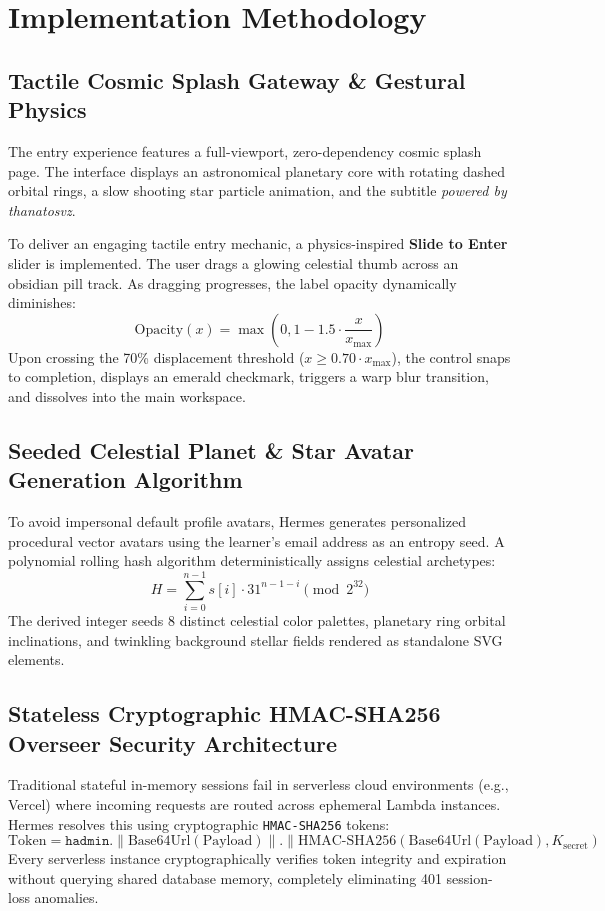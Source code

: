 \documentclass[12pt,a4paper]{article}
\begin{document}
\section{Implementation Methodology}

\subsection{Tactile Cosmic Splash Gateway \& Gestural Physics}
The entry experience features a full-viewport, zero-dependency cosmic splash page. The interface displays an astronomical planetary core with rotating dashed orbital rings, a slow shooting star particle animation, and the subtitle \textit{powered by thanatosvz}. 

To deliver an engaging tactile entry mechanic, a physics-inspired \textbf{Slide to Enter} slider is implemented. The user drags a glowing celestial thumb across an obsidian pill track. As dragging progresses, the label opacity dynamically diminishes:
\begin{equation}
\text{Opacity}(x) = \max\left(0, 1 - 1.5 \cdot \frac{x}{x_{\max}}\right)
\end{equation}
Upon crossing the 70\% displacement threshold ($x \ge 0.70 \cdot x_{\max}$), the control snaps to completion, displays an emerald checkmark, triggers a warp blur transition, and dissolves into the main workspace.

\subsection{Seeded Celestial Planet \& Star Avatar Generation Algorithm}
To avoid impersonal default profile avatars, Hermes generates personalized procedural vector avatars using the learner's email address as an entropy seed. A polynomial rolling hash algorithm deterministically assigns celestial archetypes:
\begin{equation}
H = \sum_{i=0}^{n-1} s[i] \cdot 31^{n-1-i} \pmod{2^{32}}
\end{equation}
The derived integer seeds 8 distinct celestial color palettes, planetary ring orbital inclinations, and twinkling background stellar fields rendered as standalone SVG elements.

\subsection{Stateless Cryptographic HMAC-SHA256 Overseer Security Architecture}
Traditional stateful in-memory sessions fail in serverless cloud environments (e.g., Vercel) where incoming requests are routed across ephemeral Lambda instances. Hermes resolves this using cryptographic \texttt{HMAC-SHA256} tokens:
\begin{equation}
\text{Token} = \texttt{hadmin.} \parallel \text{Base64Url}(\text{Payload}) \parallel \texttt{.} \parallel \text{HMAC-SHA256}(\text{Base64Url}(\text{Payload}), K_{\text{secret}})
\end{equation}
Every serverless instance cryptographically verifies token integrity and expiration without querying shared database memory, completely eliminating 401 session-loss anomalies.
\end{document}
